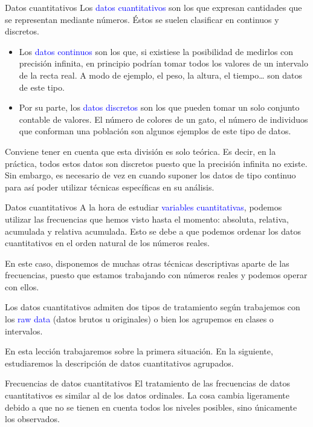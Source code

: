 \documentclass[
  ignorenonframetext,
  aspectratio=169]{beamer}
\newcommand\blue[1]{\textcolor{blue}{#1}}
\begin{document}
\begin{frame}{Datos cuantitativos}
\protect\hypertarget{datos-cuantitativos}{}
Los \blue{datos cuantitativos} son los que expresan cantidades que se
representan mediante números. Éstos se suelen clasificar en continuos y
discretos.

\begin{itemize}
\item
  Los \blue{datos continuos} son los que, si existiese la posibilidad de
  medirlos con precisión infinita, en principio podrían tomar todos los
  valores de un intervalo de la recta real. A modo de ejemplo, el peso,
  la altura, el tiempo\ldots{} son datos de este tipo.
\item
  Por su parte, los \blue{datos discretos} son los que pueden tomar un
  solo conjunto contable de valores. El número de colores de un gato, el
  número de individuos que conforman una población son algunos ejemplos
  de este tipo de datos.
\end{itemize}

Conviene tener en cuenta que esta división es solo teórica. Es decir, en
la práctica, todos estos datos son discretos puesto que la precisión
infinita no existe. Sin embargo, es necesario de vez en cuando suponer
los datos de tipo continuo para así poder utilizar técnicas específicas
en su análisis.
\end{frame}

\begin{frame}{Datos cuantitativos}
\protect\hypertarget{datos-cuantitativos-1}{}
A la hora de estudiar \blue{variables cuantitativas}, podemos utilizar
las frecuencias que hemos visto hasta el momento: absoluta, relativa,
acumulada y relativa acumulada. Esto se debe a que podemos ordenar los
datos cuantitativos en el orden natural de los números reales.

En este caso, disponemos de muchas otras técnicas descriptivas aparte de
las frecuencias, puesto que estamos trabajando con números reales y
podemos operar con ellos.

Los datos cuantitativos admiten dos tipos de tratamiento según
trabajemos con los \blue{raw data} (datos brutos u originales) o bien
los agrupemos en clases o intervalos.

En esta lección trabajaremos sobre la primera situación. En la
siguiente, estudiaremos la descripción de datos cuantitativos agrupados.
\end{frame}

\begin{frame}{Frecuencias de datos cuantitativos}
\protect\hypertarget{frecuencias-de-datos-cuantitativos}{}
El tratamiento de las frecuencias de datos cuantitativos es similar al
de los datos ordinales. La cosa cambia ligeramente debido a que no se
tienen en cuenta todos los niveles posibles, sino únicamente los
observados.
\end{frame}
\end{document}
